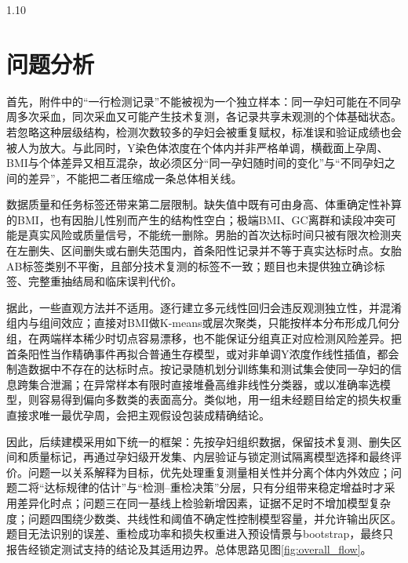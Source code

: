\documentclass[12pt,a4paper]{ctexrep}
\numberwithin{equation}{section}
\begin{document}
\begin{spacing}{1.10}
{			\section{问题分析}
			首先，附件中的“一行检测记录”不能被视为一个独立样本：同一孕妇可能在不同孕周多次采血，同次采血又可能产生技术复测，各记录共享未观测的个体基础状态。若忽略这种层级结构，检测次数较多的孕妇会被重复赋权，标准误和验证成绩也会被人为放大。与此同时，Y染色体浓度在个体内并非严格单调，横截面上孕周、BMI与个体差异又相互混杂，故必须区分“同一孕妇随时间的变化”与“不同孕妇之间的差异”，不能把二者压缩成一条总体相关线。

			数据质量和任务标签还带来第二层限制。缺失值中既有可由身高、体重确定性补算的BMI，也有因胎儿性别而产生的结构性空白；极端BMI、GC离群和读段冲突可能是真实风险或质量信号，不能统一删除。男胎的首次达标时间只被有限次检测夹在左删失、区间删失或右删失范围内，首条阳性记录并不等于真实达标时点。女胎AB标签类别不平衡，且部分技术复测的标签不一致；题目也未提供独立确诊标签、完整重抽结局和临床误判代价。

			据此，一些直观方法并不适用。逐行建立多元线性回归会违反观测独立性，并混淆组内与组间效应；直接对BMI做K-means或层次聚类，只能按样本分布形成几何分组，在两端样本稀少时切点容易漂移，也不能保证分组真正对应检测风险差异。把首条阳性当作精确事件再拟合普通生存模型，或对非单调Y浓度作线性插值，都会制造数据中不存在的达标时点。按记录随机划分训练集和测试集会使同一孕妇的信息跨集合泄漏；在异常样本有限时直接堆叠高维非线性分类器，或以准确率选模型，则容易得到偏向多数类的表面高分。类似地，用一组未经题目给定的损失权重直接求唯一最优孕周，会把主观假设包装成精确结论。

			因此，后续建模采用如下统一的框架：先按孕妇组织数据，保留技术复测、删失区间和质量标记，再通过孕妇级开发集、内层验证与锁定测试隔离模型选择和最终评价。问题一以关系解释为目标，优先处理重复测量相关性并分离个体内外效应；问题二将“达标规律的估计”与“检测--重检决策”分层，只有分组带来稳定增益时才采用差异化时点；问题三在同一基线上检验新增因素，证据不足时不增加模型复杂度；问题四围绕少数类、共线性和阈值不确定性控制模型容量，并允许输出灰区。题目无法识别的误差、重检成功率和损失权重进入预设情景与bootstrap，最终只报告经锁定测试支持的结论及其适用边界。总体思路见图\ref{fig:overall_flow}。

}
\end{spacing}
\end{document}
